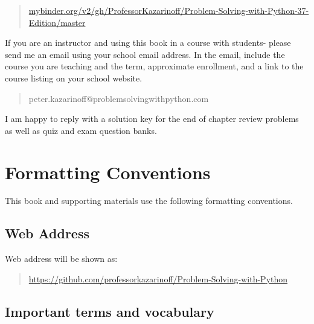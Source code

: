 \documentclass{book}
\begin{document}
\begin{quote}
\href{https://mybinder.org/v2/gh/ProfessorKazarinoff/Problem-Solving-with-Python-37-Edition/master}{mybinder.org/v2/gh/ProfessorKazarinoff/Problem-Solving-with-Python-37-Edition/master}
\end{quote}

If you are an instructor and using this book in a course with students-
please send me an email using your school email address. In the email,
include the course you are teaching and the term, approximate
enrollment, and a link to the course listing on your school website.

\begin{quote}
peter.kazarinoff@problemsolvingwithpython.com
\end{quote}

I am happy to reply with a solution key for the end of chapter review
problems as well as quiz and exam question banks.
    




    
        \hypertarget{formatting-conventions}{%
\section*{Formatting Conventions}\label{formatting-conventions} 
 }    




    
        This book and supporting materials use the following formatting
conventions.
    




    
        \hypertarget{web-address}{%
\subsection{Web Address}\label{web-address}}

Web address will be shown as:

\begin{quote}
\url{https://github.com/professorkazarinoff/Problem-Solving-with-Python}
\end{quote}
    




    
        \hypertarget{important-terms-and-vocabulary}{%
\subsection{Important terms and
vocabulary}\label{important-terms-and-vocabulary}}
\end{document}
